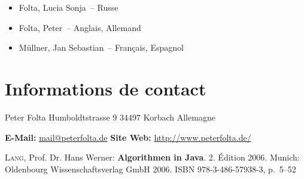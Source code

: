 \documentclass[11pt, a4paper, titlepage, twoside]{article}
\renewcommand{\emph}{\textbf}
\begin{document}
	\begin{itemize}
		\item{Folta, Lucia Sonja~-- Russe}
		\item{Folta, Peter~-- Anglais, Allemand}
		\item{Müllner, Jan Sebastian~-- Français, Espagnol}
	\end{itemize}
	
	\section{Informations de contact}
	
	\noindent{}Peter Folta\newline{}
	Humboldtstrasse 9\newline{}
	34497 Korbach\newline{}
	Allemagne\newline{}
	
	\noindent{}\textbf{E-Mail:} \href{mailto:mail@peterfolta.de}{mail@peterfolta.de}\newline{}
	\textbf{Site Web:} \href{http://www.peterfolta.de/}{http://www.peterfolta.de/}
	
	\begin{thebibliography}{99}
			\textsc{Lang}, Prof. Dr. Hans Werner: \emph{Algorithmen in Java}. 2. Édition 2006. Munich: Oldenbourg Wissenschaftsverlag GmbH 2006. ISBN 978-3-486-57938-3, p.~5--52
		\end{thebibliography}
	
	\listoffigures{}
	\lstlistoflistings{}
\end{document}
